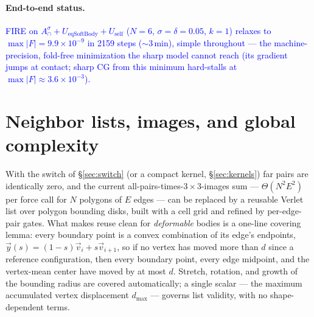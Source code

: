 \documentclass[11pt]{article}
\newcommand{\aside}[1]{\textcolor{blue}{#1}}
\newcommand{\Acap}{A^{\sigma}_{\cap}}
\begin{document}
\paragraph{End-to-end status.}
\aside{FIRE on $\Acap+U_{\text{eqSoftBody}}+U_{\text{self}}$ ($N=6$,
$\sigma=\delta=0.05$, $k=1$) relaxes to $\max|F|=9.9\times10^{-9}$ in 2159 steps
($\sim3$\,min), simple throughout --- the machine-precision, fold-free minimization
the sharp model cannot reach (its gradient jumps at contact; sharp CG from this
minimum hard-stalls at $\max|F|\approx3.6\times10^{-3}$).}

\section{Neighbor lists, images, and global complexity}
\label{sec:neighbors}

With the switch of \S\ref{sec:switch} (or a compact kernel, \S\ref{sec:kernels})
far pairs are identically zero, and the current all-pairs-times-$3{\times}3$-images
sum --- $\Theta(N^2E^2)$ per force call for $N$ polygons of $E$ edges --- can be
replaced by a reusable Verlet list \cite{Verlet1967,AllenTildesley2017} over polygon
bounding disks, built with a cell grid and refined by per-edge-pair gates.  What
makes reuse clean for \emph{deformable} bodies is a one-line covering lemma: every
boundary point is a convex combination of its edge's endpoints,
$\vec y(s)=(1{-}s)\vec v_i+s\vec v_{i+1}$, so if no vertex has moved more than $d$
since a reference configuration, then every boundary point, every edge midpoint,
and the vertex-mean center have moved by at most $d$.  Stretch, rotation, and growth
of the bounding radius are covered automatically; a single scalar --- the maximum
accumulated vertex displacement $d_{\max}$ --- governs list validity, with no
shape-dependent terms.
\end{document}

